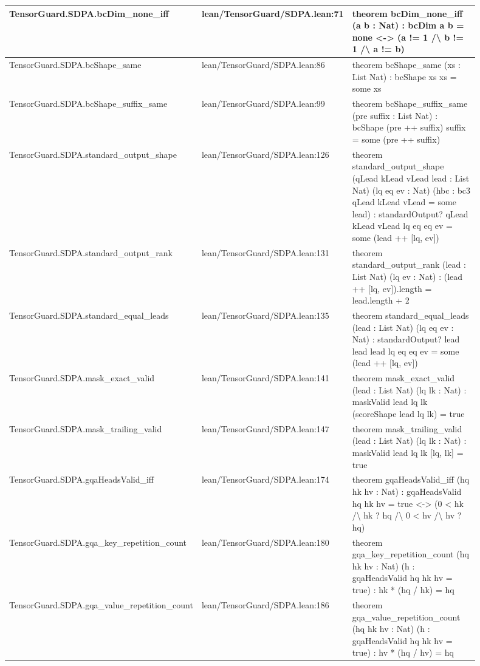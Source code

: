 \documentclass[10pt]{article}
\begin{document}
\begin{longtable}{|p{0.30\linewidth}|p{0.14\linewidth}|p{0.46\linewidth}|}
\hline
TensorGuard.SDPA.bcDim\_none\_iff & lean/TensorGuard/SDPA.lean:71 & theorem bcDim\_none\_iff (a b : Nat) : bcDim a b = none <-> (a != 1 /\textbackslash{} b != 1 /\textbackslash{} a != b) \\
\hline
TensorGuard.SDPA.bcShape\_same & lean/TensorGuard/SDPA.lean:86 & theorem bcShape\_same (xs : List Nat) : bcShape xs xs = some xs \\
\hline
TensorGuard.SDPA.bcShape\_suffix\_same & lean/TensorGuard/SDPA.lean:99 & theorem bcShape\_suffix\_same (pre suffix : List Nat) : bcShape (pre ++ suffix) suffix = some (pre ++ suffix) \\
\hline
TensorGuard.SDPA.standard\_output\_shape & lean/TensorGuard/SDPA.lean:126 & theorem standard\_output\_shape (qLead kLead vLead lead : List Nat) (lq eq ev : Nat) (hbc : bc3 qLead kLead vLead = some lead) : standardOutput? qLead kLead vLead lq eq eq ev = some (lead ++ [lq, ev]) \\
\hline
TensorGuard.SDPA.standard\_output\_rank & lean/TensorGuard/SDPA.lean:131 & theorem standard\_output\_rank (lead : List Nat) (lq ev : Nat) : (lead ++ [lq, ev]).length = lead.length + 2 \\
\hline
TensorGuard.SDPA.standard\_equal\_leads & lean/TensorGuard/SDPA.lean:135 & theorem standard\_equal\_leads (lead : List Nat) (lq eq ev : Nat) : standardOutput? lead lead lead lq eq eq ev = some (lead ++ [lq, ev]) \\
\hline
TensorGuard.SDPA.mask\_exact\_valid & lean/TensorGuard/SDPA.lean:141 & theorem mask\_exact\_valid (lead : List Nat) (lq lk : Nat) : maskValid lead lq lk (scoreShape lead lq lk) = true \\
\hline
TensorGuard.SDPA.mask\_trailing\_valid & lean/TensorGuard/SDPA.lean:147 & theorem mask\_trailing\_valid (lead : List Nat) (lq lk : Nat) : maskValid lead lq lk [lq, lk] = true \\
\hline
TensorGuard.SDPA.gqaHeadsValid\_iff & lean/TensorGuard/SDPA.lean:174 & theorem gqaHeadsValid\_iff (hq hk hv : Nat) : gqaHeadsValid hq hk hv = true <-> (0 < hk /\textbackslash{} hk ? hq /\textbackslash{} 0 < hv /\textbackslash{} hv ? hq) \\
\hline
TensorGuard.SDPA.gqa\_key\_repetition\_count & lean/TensorGuard/SDPA.lean:180 & theorem gqa\_key\_repetition\_count (hq hk hv : Nat) (h : gqaHeadsValid hq hk hv = true) : hk * (hq / hk) = hq \\
\hline
TensorGuard.SDPA.gqa\_value\_repetition\_count & lean/TensorGuard/SDPA.lean:186 & theorem gqa\_value\_repetition\_count (hq hk hv : Nat) (h : gqaHeadsValid hq hk hv = true) : hv * (hq / hv) = hq \\

\end{longtable}
\end{document}
